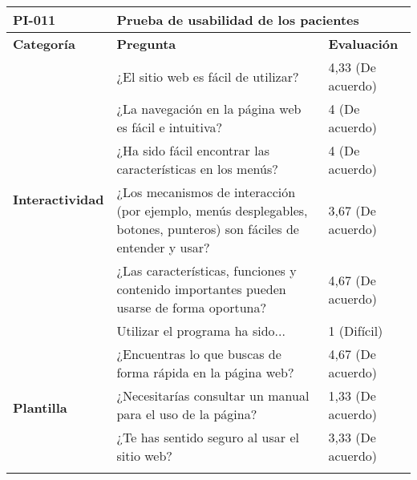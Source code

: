\begin{table}[htpb]
\centering
\begin{tabularx}{\textwidth}{|l|X|l|}
\hline
\rowcolor[gray]{0.9}\textbf{PI-011}                           & \multicolumn{2}{l|}{\textbf{Prueba de usabilidad de los pacientes}}                                                                       \\ \hline
\textbf{Categoría}                        & \textbf{Pregunta}                                                                                                   & \textbf{Evaluación} \\ \hline
\multirow{6}{*}{\textbf{Interactividad}}  & ¿El sitio web es fácil de utilizar?                                                                                 & 4,33 (De acuerdo)   \\ \cline{2-3} 
                                          & ¿La navegación en la página web es fácil e intuitiva?                                                               & 4 (De acuerdo)      \\ \cline{2-3} 
                                          & ¿Ha sido fácil encontrar las características en los menús?                                                          & 4 (De acuerdo)      \\ \cline{2-3} 
                                          & ¿Los mecanismos de interacción (por ejemplo, menús desplegables, botones, punteros) son fáciles de entender y usar? & 3,67 (De acuerdo)   \\ \cline{2-3} 
                                          & ¿Las características, funciones y contenido importantes pueden usarse de forma oportuna?                            & 4,67 (De acuerdo)   \\ \cline{2-3} 
                                          & Utilizar el programa ha sido...                                                                                     & 1 (Difícil)         \\ \hline
\multirow{4}{*}{\textbf{Plantilla}}       & ¿Encuentras lo que buscas de forma rápida en la página web?                                                         & 4,67 (De acuerdo)   \\ \cline{2-3} 
                                          & ¿Necesitarías consultar un manual para el uso de la página?                                                         & 1,33 (De acuerdo)   \\ \cline{2-3} 
                                          & ¿Te has sentido seguro al usar el sitio web?                                                                        & 3,33 (De acuerdo)   \\ \cline{2-3} 

\end{tabularx}
\end{table}
